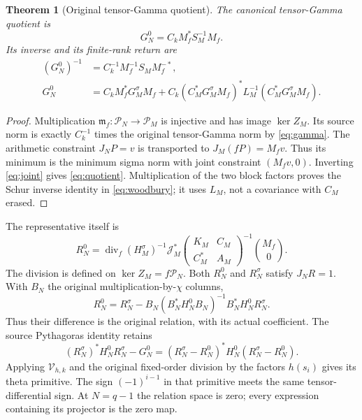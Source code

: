 \documentclass[11pt,a4paper]{article}
\newtheorem{theorem}{Theorem}[section]
\newcommand{\C}{\mathbb C}
\begin{document}
\begin{theorem}[Original tensor-Gamma quotient]
The canonical tensor-Gamma quotient is
\begin{equation}
 \boxed{G_N^0=C_k M_f^*S_M^{-1}M_f.}\label{eq:quotient}
\end{equation}
Its inverse and its finite-rank return are
\begin{align}
 (G_N^0)^{-1}&=C_k^{-1}M_f^{-1}S_MM_f^{-*},\\
 G_N^0&=C_kM_f^*G_M^\sigma M_f
 +C_k(C_M^*G_M^\sigma M_f)^*L_M^{-1}(C_M^*G_M^\sigma M_f).
 \label{eq:woodbury}
\end{align}
\end{theorem}
\begin{proof}
Multiplication $\mathfrak m_f:\mathcal P_N\to\mathcal P_M$ is injective and has image $\ker Z_M$. Its source norm is exactly $C_k^{-1}$ times the original tensor-Gamma norm by \eqref{eq:gamma}. The arithmetic constraint $J_NP=v$ is transported to $J_M(fP)=M_fv$. Thus its minimum is the minimum sigma norm with joint constraint $(M_fv,0)$. Inverting \eqref{eq:joint} gives \eqref{eq:quotient}. Multiplication of the two block factors proves the Schur inverse identity in \eqref{eq:woodbury}; it uses $L_M$, not a covariance with $C_M$ erased.
\end{proof}
The representative itself is
\begin{equation}
 R_N^0=\operatorname{div}_f
 (H_M^\sigma)^{-1}\mathscr J_M^*
 \begin{pmatrix}K_M&C_M\\C_M^*&A_M\end{pmatrix}^{-1}
 \binom{M_f}{0}.
\end{equation}
The division is defined on $\ker Z_M=f\mathcal P_N$. Both $R_N^0$ and $R_N^\sigma$ satisfy $J_NR=1$. With $B_N$ the original multiplication-by-$\chi$ columns,
\begin{equation}
 R_N^0=R_N^\sigma-B_N(B_N^*H_N^0B_N)^{-1}B_N^*H_N^0R_N^\sigma.
 \label{eq:section}
\end{equation}
Thus their difference is the original relation, with its actual coefficient. The source Pythagoras identity retains
\begin{equation}
 (R_N^\sigma)^*H_N^0R_N^\sigma-G_N^0
 =(R_N^\sigma-R_N^0)^*H_N^0(R_N^\sigma-R_N^0).
\end{equation}
Applying $\mathcal V_{h,k}$ and the original fixed-order division by the factors $h(s_i)$ gives its theta primitive. The sign $(-1)^{i-1}$ in that primitive meets the same tensor-differential sign. At $N=q-1$ the relation space is zero; every expression containing its projector is the zero map.
\end{document}
